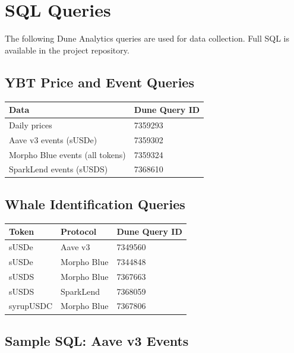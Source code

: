 \section{SQL Queries}
\label{sec:queries}

The following Dune Analytics queries are used for data collection. Full SQL is available in the project repository.

\subsection*{YBT Price and Event Queries}

\begin{table}[h]
\centering
\begin{tabular}{ll}
\hline
\textbf{Data} & \textbf{Dune Query ID} \\
\hline
Daily prices & 7359293 \\
Aave v3 events (sUSDe) & 7359302 \\
Morpho Blue events (all tokens) & 7359324 \\
SparkLend events (sUSDS) & 7368610 \\
\hline
\end{tabular}
\end{table}

\subsection*{Whale Identification Queries}

\begin{table}[h]
\centering
\begin{tabular}{lll}
\hline
\textbf{Token} & \textbf{Protocol} & \textbf{Dune Query ID} \\
\hline
sUSDe & Aave v3 & 7349560 \\
sUSDe & Morpho Blue & 7344848 \\
sUSDS & Morpho Blue & 7367663 \\
sUSDS & SparkLend & 7368059 \\
syrupUSDC & Morpho Blue & 7367806 \\
\hline
\end{tabular}
\end{table}

\subsection*{Sample SQL: Aave v3 Events}

